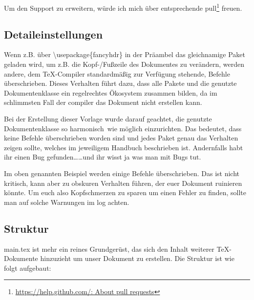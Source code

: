 Um den Support zu erweitern, würde ich mich über entsprechende \gls{pull}\footnote{\href{https://help.github.com/en/articles/about-pull-requests}{https://help.github.com/: About pull requests}} freuen.

\subsection{Detaileinstellungen}
\label{detail-grundl}
Wenn z.B. über \textbackslash usepackage\{fancyhdr\} in der Präambel das gleichnamige Paket geladen wird, um z.B. die Kopf-/Fußzeile des Dokumentes zu verändern, werden andere, dem \TeX{}-Compiler standardmäßig zur Verfügung stehende, Befehle überschrieben. Dieses Verhalten führt dazu, dass alle Pakete und die genutzte Dokumentenklasse ein regelrechtes Ökosystem zusammen bilden, da im schlimmsten Fall der \gls{compiler} das Dokument nicht erstellen kann. 

Bei der Erstellung dieser Vorlage wurde darauf geachtet, die genutzte Dokumentenklasse so \glqq harmonisch\grqq\ wie möglich einzurichten. Das bedeutet, dass keine Befehle überschrieben worden sind und jedes Paket genau das Verhalten zeigen sollte, welches im jeweiligem Handbuch beschrieben ist. Andernfalls habt ihr einen Bug gefunden\dots \dots und ihr wisst ja was man mit Bugs tut.

Im oben genannten Beispiel werden einige Befehle überschrieben. Das ist nicht kritisch, kann aber zu obskuren Verhalten führen, der euer Dokument ruinieren könnte. Um euch also Kopfschmerzen zu sparen um einen Fehler zu finden, sollte man auf solche Warnungen im log achten.

\subsection{Struktur}
main.tex ist mehr ein reines Grundgerüst, das sich den Inhalt weiterer \TeX{}-Dokumente hinzuzieht um unser Dokument zu erstellen. Die Struktur ist wie folgt aufgebaut:


